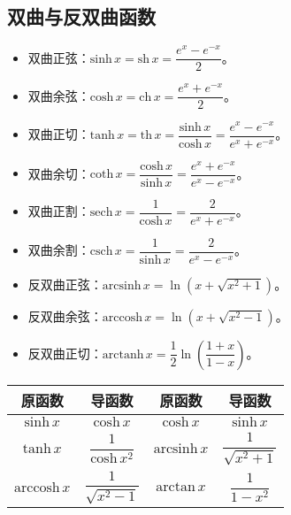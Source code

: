 \documentclass[UTF8, 12pt]{ctexart}
\begin{document}
        \subsection{双曲与反双曲函数}

        \begin{itemize}
            \item 双曲正弦：$\textrm{sinh}\,x=\textrm{sh}\,x=\dfrac{e^{x}-e^{-x}}{2}$。
            \item 双曲余弦：$\textrm{cosh}\,x=\textrm{ch}\,x=\dfrac{e^{x}+e^{-x}}{2}$。
            \item 双曲正切：$\textrm{tanh}\,x=\textrm{th}\,x=\dfrac{\textrm{sinh}\,x}{\textrm{cosh}\,x}=\dfrac{e^{x}-e^{-x}}{e^{x}+e^{-x}}$。
            \item 双曲余切：$\textrm{coth}\,x=\dfrac{\textrm{cosh}\,x}{\textrm{sinh}\,x}=\dfrac{e^{x}+e^{-x}}{e^{x}-e^{-x}}$。
            \item 双曲正割：$\textrm{sech}\,x=\dfrac{1}{\textrm{cosh}\,x}=\dfrac{2}{e^{x}+e^{-x}}$。
            \item 双曲余割：$\textrm{csch}\,x=\dfrac{1}{\textrm{sinh}\,x}=\dfrac{2}{e^{x}-e^{-x}}$。
            \item 反双曲正弦：$\textrm{arcsinh}\,x=\ln\left(x+\sqrt{x^2+1}\right)$。
            \item 反双曲余弦：$\textrm{arccosh}\,x=\ln\left(x+\sqrt{x^2-1}\right)$。
            \item 反双曲正切：$\textrm{arctanh}\,x=\dfrac{1}{2}\ln\left(\dfrac{1+x}{1-x}\right)$。
        \end{itemize}

        \begin{center}
            \begin{tabular}{|c|c|c|c|}
                \hline
                原函数 & 导函数 & 原函数 & 导函数\\ \hline
                $\textrm{sinh}\,x$ & $\textrm{cosh}\,x$ & $\textrm{cosh}\,x$ & $\textrm{sinh}\,x$ \\ \hline
                $\textrm{tanh}\,x$ & $\dfrac{1}{\textrm{cosh}\,x^2}$ & $\textrm{arcsinh}\,x$ & $\dfrac{1}{\sqrt{x^2+1}}$ \\ \hline
                $\textrm{arccosh}\,x$ & $\dfrac{1}{\sqrt{x^2-1}}$ & $\textrm{arctan}\,x$ & $\dfrac{1}{1-x^2}$ \\
                \hline
            \end{tabular}
        \end{center}
\end{document}

